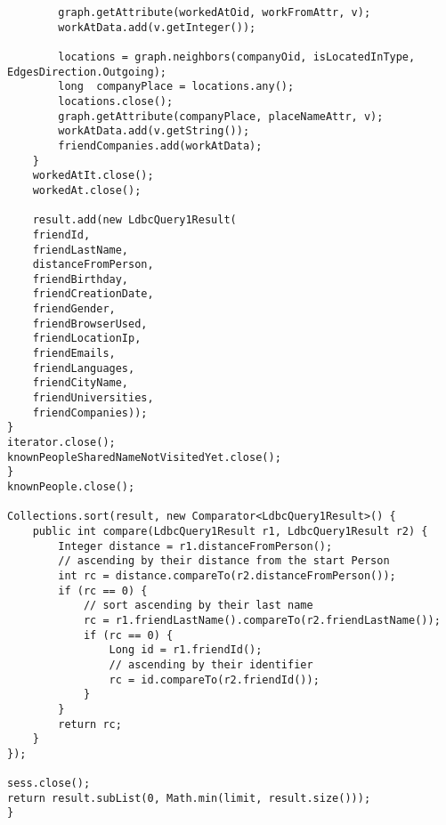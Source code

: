 {\begin{verbatim}
        graph.getAttribute(workedAtOid, workFromAttr, v);
        workAtData.add(v.getInteger());

        locations = graph.neighbors(companyOid, isLocatedInType, EdgesDirection.Outgoing);
        long  companyPlace = locations.any();
        locations.close();
        graph.getAttribute(companyPlace, placeNameAttr, v);
        workAtData.add(v.getString());
        friendCompanies.add(workAtData);
    }
    workedAtIt.close();
    workedAt.close();

    result.add(new LdbcQuery1Result(
    friendId,
    friendLastName,
    distanceFromPerson,
    friendBirthday,
    friendCreationDate,
    friendGender,
    friendBrowserUsed,
    friendLocationIp,
    friendEmails,
    friendLanguages,
    friendCityName,
    friendUniversities,
    friendCompanies));
}
iterator.close();
knownPeopleSharedNameNotVisitedYet.close();
}
knownPeople.close();

Collections.sort(result, new Comparator<LdbcQuery1Result>() {
    public int compare(LdbcQuery1Result r1, LdbcQuery1Result r2) {
        Integer distance = r1.distanceFromPerson();
        // ascending by their distance from the start Person
        int rc = distance.compareTo(r2.distanceFromPerson()); 
        if (rc == 0) {
            // sort ascending by their last name
            rc = r1.friendLastName().compareTo(r2.friendLastName()); 
            if (rc == 0) {
                Long id = r1.friendId();
                // ascending by their identifier
                rc = id.compareTo(r2.friendId()); 
            }
        }
        return rc;
    }
});

sess.close();
return result.subList(0, Math.min(limit, result.size()));
}

\end{verbatim}
}

